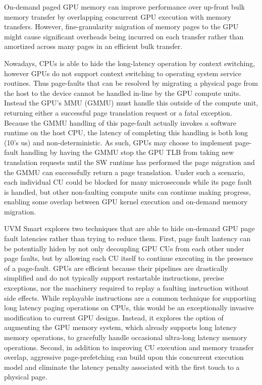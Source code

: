 On-demand paged GPU memory can improve performance over up-front bulk memory transfer by overlapping concurrent GPU execution with memory transfers. However, fine-granularity migration of memory pages to the GPU might cause significant overheads being incurred on each transfer rather than amortized across many pages in an efficient bulk transfer. 

Nowadays, CPUs is able to hide the long-latency operation by context switching, however GPUs do not support context switching to operating system service routines. Thus page-faults that can be resolved by migrating a physical page from the host to the device cannot be handled in-line by the GPU compute units. Instead the GPU’s MMU (GMMU) must handle this outside of the compute unit, returning either a successful page translation request or a fatal exception. Because the GMMU handling of this page-fault actually invokes a software runtime on the host CPU, the latency of completing this handling is both long (10’s us) and non-deterministic. As such, GPUs may choose to implement page-fault handling by having the GMMU stop the GPU TLB from taking new translation requests until the SW runtime has performed the page migration and the GMMU can successfully return a page translation. Under such a scenario, each individual CU could be blocked for many microseconds while its page fault is handled, but other non-faulting compute units can continue making progress, enabling some overlap between GPU kernel execution and on-demand memory migration.

UVM Smart explores two techniques that are able to hide on-demand GPU page fault latencies rather than trying to reduce them. First, page fault lantency can be potentially hiden by not only decoupling GPU CUs from each other under page faults, but by allowing each CU itself to continue executing in the presence of a page-fault. GPUs are efficient because their pipelines are drastically simplified and do not typically support restartable instructions, precise exceptions, nor the machinery required to replay a faulting instruction without side effects. While replayable instructions are a common technique for supporting long latency paging operations on CPUs, this would be an exceptionally invasive modification to current GPU designs. Instead, it explores the option of augmenting the GPU memory system, which already supports long latency memory operations, to gracefully handle occasional ultra-long latency memory operations. Second, in addition to improving CU execution and memory transfer overlap, aggressive page-prefetching can build upon this concurrent execution model and eliminate the latency penalty associated with the first touch to a physical page.